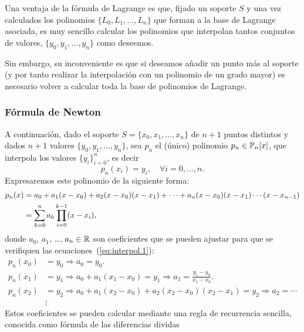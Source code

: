     \begin{remark}
      Una ventaja de la fórmula de Lagrange es que, fijado un soporte $S$
      y una vez calculados los polinomios $\{L_0,L_1,\dots, L_n\}$ que
      forman a la base de Lagrange asociada, es muy sencillo calcular los
      polinomios que interpolan tantos conjuntos de valores,
      $\{y_0,y_1,\dots,y_n\}$ como deseemos. 

      Sin embargo, su inconveniente es que si deseamos añadir un punto más
      al soporte (y por tanto realizar la interpolación con un polinomio
      de un grado mayor) es necesario volver a calcular toda la base de
      polinomios de Lagrange.
    \end{remark}

    \subsubsection{Fórmula de Newton}
    \label{sec:formula-de-newton}
    A continuación, dado el soporte $S=\{x_0,x_1,\dots,x_n\}$ de $n+1$ puntos
    distintos y dados $n+1$ valores $\{y_0,y_1,\dots,y_n\}$, sea
    $p_n$ el (único) polinomio $p_n \in \operatorname{{\mathbb P}}_n[x]$, que
    interpola los valores $\{y_i\}_{i=0}^n$, es decir
    \begin{equation}
    p_n(x_i)=y_i, \quad \forall i=0,...,n.
    \label{eq:interpol.1}
    \end{equation}
    Expresaremos este polinomio de la siguiente forma:
    \begin{align}
      \notag
      p_n(x)&=a_0 + a_1 (x-x_0) + a_2(x-x_0)(x-x_1) + \cdots 
      + a_n(x-x_0)(x-x_1)\cdots(x-x_{n-1}) \\
      &=\sum_{k=0}^n a_k \prod_{i=0}^{k-1}(x-x_i),
    \label{eq:pol.newton.dif-div}
    \end{align}
    donde $a_0$, $a_1$, \dots, $a_n\in\operatorname{{\mathbb R}}$ son coeficientes que se
    pueden ajustar para que se verifiquen las
    ecuaciones~(\ref{eq:interpol.1}):
    \begin{align*}
      p_n(x_0)&=y_0 \Rightarrow a_0=y_0.\\
      p_n(x_1)&=y_1 \Rightarrow a_0+a_1(x_1-x_0)=y_1 
      \Rightarrow a_1=\frac{y_1-y_0}{x_1-x_0}.\\
      p_n(x_2)&=y_2 \Rightarrow a_0+a_1(x_2-x_0)+a_2(x_2-x_0)(x_2-x_1)=y_2 
      \Rightarrow a_2=\cdots\\
      &\vdots
    \end{align*}
    Estos coeficientes se pueden calcular mediante una regla de
    recurrencia sencilla, conocida como fórmula de las diferencias dividas
